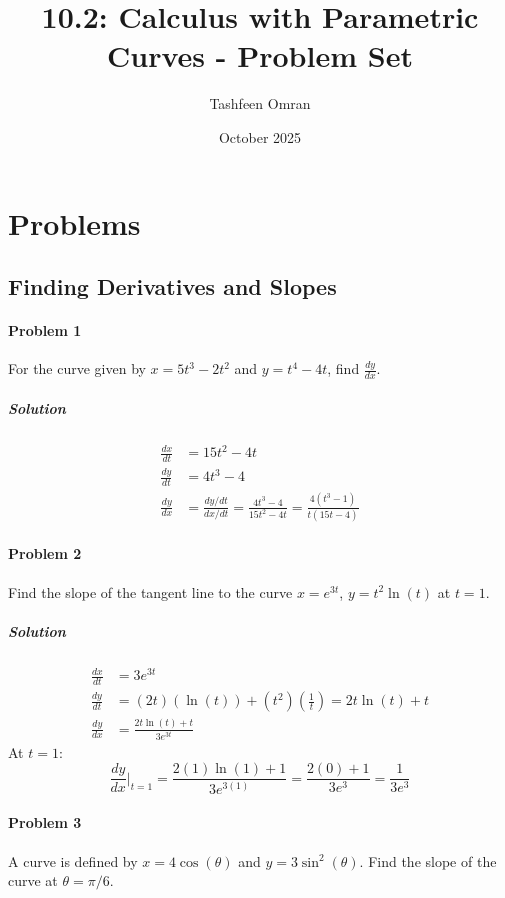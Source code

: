 \documentclass{article}
\title{10.2: Calculus with Parametric Curves - Problem Set}
\author{Tashfeen Omran}
\date{October 2025}
\begin{document}
\maketitle

\section*{Problems}

\subsection*{Finding Derivatives and Slopes}

\paragraph{Problem 1}
For the curve given by $x = 5t^3 - 2t^2$ and $y = t^4 - 4t$, find $\frac{dy}{dx}$.

\subparagraph{Solution}
\begin{align*}
\frac{dx}{dt} &= 15t^2 - 4t \\
\frac{dy}{dt} &= 4t^3 - 4 \\
\frac{dy}{dx} &= \frac{dy/dt}{dx/dt} = \frac{4t^3 - 4}{15t^2 - 4t} = \frac{4(t^3 - 1)}{t(15t - 4)}
\end{align*}

\paragraph{Problem 2}
Find the slope of the tangent line to the curve $x = e^{3t}$, $y = t^2 \ln(t)$ at $t=1$.

\subparagraph{Solution}
\begin{align*}
\frac{dx}{dt} &= 3e^{3t} \\
\frac{dy}{dt} &= (2t)(\ln(t)) + (t^2)\left(\frac{1}{t}\right) = 2t\ln(t) + t \\
\frac{dy}{dx} &= \frac{2t\ln(t) + t}{3e^{3t}}
\end{align*}
At $t=1$:
\[ \frac{dy}{dx}\bigg|_{t=1} = \frac{2(1)\ln(1) + 1}{3e^{3(1)}} = \frac{2(0) + 1}{3e^3} = \frac{1}{3e^3} \]

\paragraph{Problem 3}
A curve is defined by $x = 4\cos(\theta)$ and $y = 3\sin^2(\theta)$. Find the slope of the curve at $\theta = \pi/6$.
\end{document}
